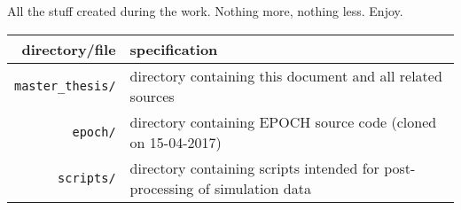 All the stuff created during the work. Nothing more, nothing less. Enjoy.\\

\centering
{\renewcommand{\arraystretch}{1.5}
	\begin{tabular}{rl}
		\hline \textbf{directory/file} & \textbf{specification} \\
		\hline
		\hline
		\texttt{master\_thesis/} & \parbox[t]{8cm}{directory containing this document and all related sources} \\
		\texttt{epoch/} & \parbox[t]{8cm}{directory containing EPOCH source code (cloned on 15-04-2017)} \\
		\texttt{scripts/} & \parbox[t]{8cm}{directory containing scripts intended for post-processing of simulation data} \\
		\hline
	\end{tabular}
}